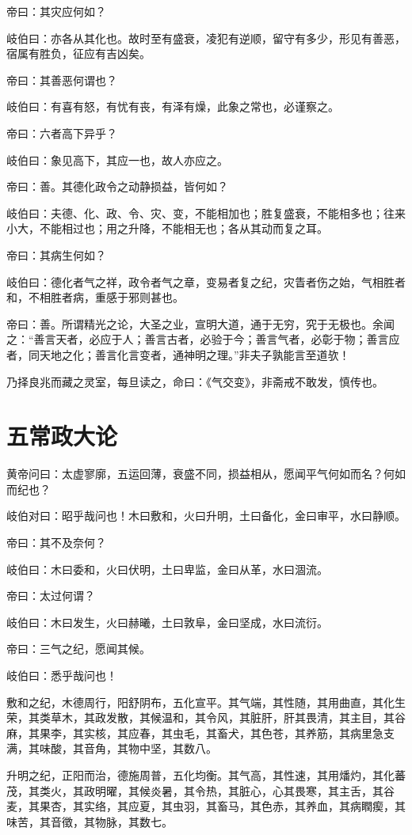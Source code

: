 \documentclass{article}%
\begin{document}
帝曰：其灾应何如？

岐伯曰：亦各从其化也。故时至有盛衰，凌犯有逆顺，留守有多少，形见有善恶，宿属有胜负，征应有吉凶矣。

帝曰：其善恶何谓也？

岐伯曰：有喜有怒，有忧有丧，有泽有燥，此象之常也，必谨察之。

帝曰：六者高下异乎？

岐伯曰：象见高下，其应一也，故人亦应之。

帝曰：善。其德化政令之动静损益，皆何如？

岐伯曰：夫德、化、政、令、灾、变，不能相加也；胜复盛衰，不能相多也；往来小大，不能相过也；用之升降，不能相无也；各从其动而复之耳。

帝曰：其病生何如？

岐伯曰：德化者气之祥，政令者气之章，变易者复之纪，灾眚者伤之始，气相胜者和，不相胜者病，重感于邪则甚也。

帝曰：善。所谓精光之论，大圣之业，宣明大道，通于无穷，究于无极也。余闻之：“善言天者，必应于人；善言古者，必验于今；善言气者，必彰于物；善言应者，同天地之化；善言化言变者，通神明之理。”非夫子孰能言至道欤！

乃择良兆而藏之灵室，每旦读之，命曰：《气交变》，非斋戒不敢发，慎传也。
\section{五常政大论}
黄帝问曰：太虚寥廓，五运回薄，衰盛不同，损益相从，愿闻平气何如而名？何如而纪也？

岐伯对曰：昭乎哉问也！木曰敷和，火曰升明，土曰备化，金曰审平，水曰静顺。

帝曰：其不及奈何？

岐伯曰：木曰委和，火曰伏明，土曰卑监，金曰从革，水曰涸流。

帝曰：太过何谓？

岐伯曰：木曰发生，火曰赫曦，土曰敦阜，金曰坚成，水曰流衍。

帝曰：三气之纪，愿闻其候。

岐伯曰：悉乎哉问也！

敷和之纪，木德周行，阳舒阴布，五化宣平。其气端，其性随，其用曲直，其化生荣，其类草木，其政发散，其候温和，其令风，其脏肝，肝其畏清，其主目，其谷麻，其果李，其实核，其应春，其虫毛，其畜犬，其色苍，其养筋，其病里急支满，其味酸，其音角，其物中坚，其数八。

升明之纪，正阳而治，德施周普，五化均衡。其气高，其性速，其用燔灼，其化蕃茂，其类火，其政明曜，其候炎暑，其令热，其脏心，心其畏寒，其主舌，其谷麦，其果杏，其实络，其应夏，其虫羽，其畜马，其色赤，其养血，其病瞤瘈，其味苦，其音徵，其物脉，其数七。
\end{document}
